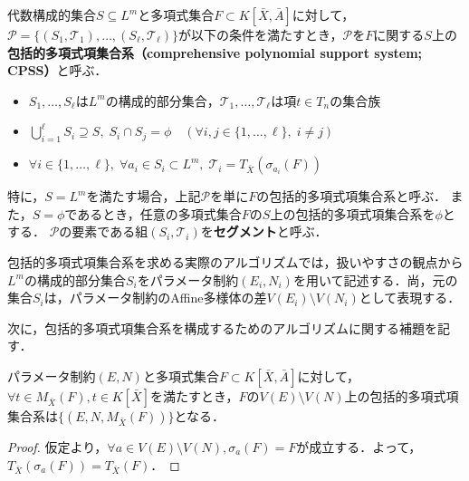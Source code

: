 \begin{definition}
	\label{chapter04:definition:CPSS}
	代数構成的集合$S \subseteq L^m$と多項式集合$F \subset K[\bar{X}, \bar{A}]$に対して，$\mathcal{P} = \{ (S_1, \mathscr{T}_1), \dots , (S_\ell, \mathscr{T}_\ell)  \}$が以下の条件を満たすとき，$\mathcal{P}$を$F$に関する$S$上の\textbf{包括的多項式項集合系（comprehensive polynomial support system; CPSS）}と呼ぶ．
	\begin{itemize}
		\item $S_1, \dots, S_\ell$は$L^m$の構成的部分集合，$\mathscr{T}_1, \dots, \mathscr{T}_\ell$は項$t \in T_n$の集合族
		\item $\displaystyle \bigcup_{i=1}^\ell S_i\supseteq S, \; S_i \cap S_j = \phi \quad (\forall i,j \in \{ 1, \dots, \ell \}, \; i \ne j)$
		\item $\forall i \in \{1, \dots, \ell \}, \; \forall a_i \in S_i \subset L^m, \; \mathscr{T}_i = T_{\bar{X}}(\sigma_{a_i}(F))$
	\end{itemize}
	特に，$S=L^m$を満たす場合，上記$\mathcal{P}$を単に$F$の包括的多項式項集合系と呼ぶ．
	また，$S=\phi$であるとき，任意の多項式集合$F$の$S$上の包括的多項式項集合系を$\phi$とする．
	$\mathcal{P}$の要素である組$(S_i, \mathscr{T}_i)$を\textbf{セグメント}と呼ぶ．
\end{definition}

\begin{remark*}
	包括的多項式項集合系を求める実際のアルゴリズムでは，扱いやすさの観点から$L^m$の構成的部分集合$S_i$をパラメータ制約$(E_i, N_i)$を用いて記述する．尚，元の集合$S_i$は，パラメータ制約のAffine多様体の差$V(E_i) \setminus V(N_i)$として表現する．
\end{remark*}

次に，包括的多項式項集合系を構成するためのアルゴリズムに関する補題を記す．

\begin{lemma}
	\label{chapter04:lemma:for_alg_1}
	パラメータ制約$(E, N)$と多項式集合$F \subset K[\bar{X}, \bar{A}]$に対して，$\forall t \in M_{\bar{X}}(F), t \in K[\bar{X}]$を満たすとき，$F$の$V(E) \setminus V(N)$上の包括的多項式項集合系は$\{(E, N, M_{\bar{X}}(F))\}$となる．
\end{lemma}

\begin{proof}
	仮定より，$\forall a \in V(E) \setminus V(N), \sigma_a(F) = F$が成立する．よって，$T_{\bar{X}}(\sigma_a(F)) = T_{\bar{X}}(F)$．
\end{proof}

